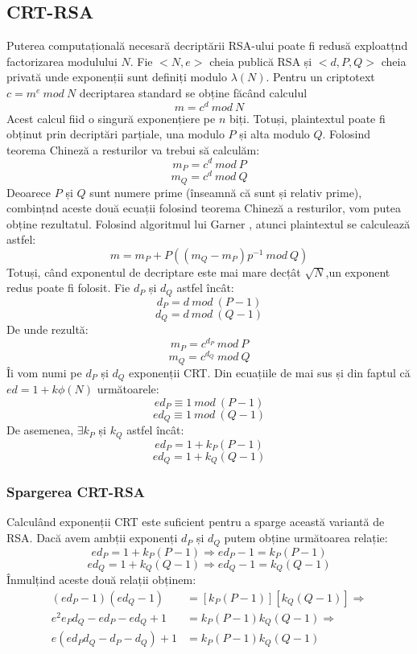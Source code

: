 \documentclass[12pt, oneside]{book}
\begin{document}
\subsection{CRT-RSA}
Puterea computațională necesară decriptării RSA-ului poate fi redusă exploatțnd factorizarea modulului $N$. Fie $<N,e>$ cheia publică RSA și $<d,P,Q>$ cheia privată unde exponenții sunt definiți modulo $\lambda(N)$. Pentru un criptotext $c=m^e \ mod \ N$ decriptarea standard se obține făcând calculul
$$ m=c^d \ mod \ N$$
Acest calcul fiid o singură exponențiere pe $n$ biți. Totuși, plaintextul poate fi obținut prin decriptări parțiale, una modulo $P$ și alta modulo $Q$. Folosind teorema Chineză a resturilor  va trebui să calculăm:
$$ m_P = c^d \ mod \ P$$
$$ m_Q = c^d \ mod \ Q$$
Deoarece $P$ și $Q$ sunt numere prime (înseamnă că sunt și relativ prime), combințnd aceste două ecuații folosind teorema Chineză a resturilor, vom putea obține rezultatul. Folosind algoritmul lui Garner \cite{garner}, atunci plaintextul se calculează astfel:
$$ m=m_P+P((m_Q-m_P)p^{-1} \ mod \ Q)$$
Totuși, când exponentul de decriptare este mai mare decțât $\sqrt{N}$,un exponent redus poate fi folosit. Fie $d_P$ și $d_Q$ astfel încât:
$$ d_P = d \ mod \ (P-1) $$
$$ d_Q = d \ mod \ (Q-1) $$
De unde rezultă:
$$ m_P = c^{d_P} \ mod \ P $$
$$ m_Q = c^{d_Q} \ mod \ Q $$
Îi vom numi pe $ d_P $ și $d_Q$ exponenții CRT. Din ecuațiile de mai sus și din faptul că $ed = 1+ k\phi(N)$ următoarele:
$$ ed_P \equiv 1 \ mod \ (P-1)$$
$$ ed_Q \equiv 1 \ mod \ (Q-1)$$
De asemenea, $\exists k_P$ și $k_Q$ astfel încât:
$$ ed_P = 1 + k_P(P-1)$$
$$ ed_Q = 1+ k_Q(Q-1)$$
\subsubsection{Spargerea CRT-RSA}
Calculând exponenții CRT este suficient pentru a sparge această variantă de RSA. Dacă avem ambții exponenți $d_P$ și $d_Q$ putem obține următoarea relație:
$$ed_P = 1 + k_P(P-1) \Rightarrow ed_P -1 = k_P(P-1)$$
$$ed_Q = 1 + k_Q(Q-1) \Rightarrow ed_Q -1 =k_Q(Q-1)$$
Înmulțind aceste două relații obținem:
\begin{align*}
 (ed_P -1 ) (ed_Q -1) &= [k_P(P-1)][k_Q(Q-1)] \Rightarrow \\ 
 e^2e_Pd_Q - ed_P - ed_Q +1 &= k_P(P-1)k_Q(Q-1) \Rightarrow \\
 e(ed_Pd_Q - d_P -d_Q)+1 &= k_P(P-1)k_Q(Q-1)
\end{align*}
\end{document}
